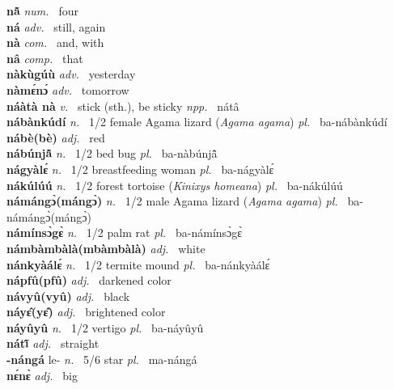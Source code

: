 \noindent
{\bfseries nã̂}  {\itshape num.~} four    \\ 
{\bfseries ná}  {\itshape adv.~} still, again    \\ 
{\bfseries nà}  {\itshape com.~} and, with    \\ 
{\bfseries nâ}  {\itshape comp.~} that    \\ 
{\bfseries nàkùgúù}  {\itshape adv.~} yesterday    \\ 
{\bfseries nàmɛ́nɔ́}  {\itshape adv.~} tomorrow    \\ 
{\bfseries náàtà nà}  {\itshape v.~} stick (sth.), be sticky   {\itshape npp.~} nátâ  \\ 
{\bfseries nábànkúdí} {\itshape n.~} 1/2 female Agama lizard ({\itshape Agama agama}) {\itshape pl.~} ba-nábànkúdí    \\ 
{\bfseries nábè(bè)} {\itshape adj.~} red    \\ 
{\bfseries nábúnjã̂} {\itshape n.~} 1/2 bed bug {\itshape pl.~} ba-nàbúnjã̂  \\ 
{\bfseries nágyàlɛ́} {\itshape n.~} 1/2 breastfeeding woman {\itshape pl.~} ba-nágyàlɛ́    \\ 
{\bfseries nákúlúú} {\itshape n.~} 1/2 forest tortoise ({\itshape Kinixys homeana}) {\itshape pl.~} ba-nákúlúú    \\ 
{\bfseries námángɔ̀(mángɔ̀)} {\itshape n.~} 1/2 male Agama lizard ({\itshape Agama agama}) {\itshape pl.~} ba-námángɔ̀(mángɔ̀)    \\ 
{\bfseries námínsɔ̀gɛ̀} {\itshape n.~} 1/2 palm rat {\itshape pl.~} ba-námínsɔ̀gɛ̀    \\ 
{\bfseries námbàmbàlà(mbàmbàlà)} {\itshape adj.~} white    \\ 
{\bfseries nánkyàálɛ́} {\itshape n.~} 1/2 termite mound {\itshape pl.~} ba-nánkyàálɛ́    \\ 
{\bfseries nápfû(pfû)} {\itshape adj.~} darkened color    \\ 
{\bfseries návyû(vyû)} {\itshape adj.~} black    \\ 
{\bfseries náyɛ̂(yɛ̂)}  {\itshape adj.~} brightened color    \\ 
{\bfseries náyûyû}  {\itshape n.~} 1/2 vertigo {\itshape pl.~} ba-náyûyû    \\ 
{\bfseries nátĩ̂}  {\itshape adj.~} straight    \\ 
{\bfseries -nángá} le- {\itshape n.~} 5/6 star {\itshape pl.~} ma-nángá    \\ 
{\bfseries nɛ́nɛ̀}  {\itshape adj.~} big    \\ 

